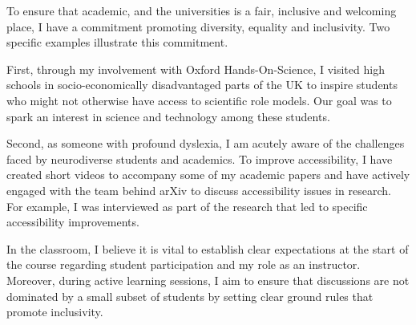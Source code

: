 \documentclass[12pt,letter]{article}
\newcounter{customtitle}
\begin{document}
To ensure that academic, and the universities is a fair, inclusive and welcoming place, I have a commitment promoting diversity, equality and inclusivity. Two specific examples illustrate this commitment.

First, through my involvement with Oxford Hands-On-Science, I visited high schools in socio-economically disadvantaged parts of the UK to inspire students who might not otherwise have access to scientific role models. Our goal was to spark an interest in science and technology among these students.

Second, as someone with profound dyslexia, I am acutely aware of the challenges faced by neurodiverse students and academics. To improve accessibility, I have created short videos to accompany some of my academic papers and have actively engaged with the team behind arXiv to discuss accessibility issues in research. For example, I was interviewed as part of the research that led to specific accessibility improvements.

In the classroom, I believe it is vital to establish clear expectations at the start of the course regarding student participation and my role as an instructor. Moreover, during active learning sessions, I aim to ensure that discussions are not dominated by a small subset of students by setting clear ground rules that promote inclusivity.



\end{document}
